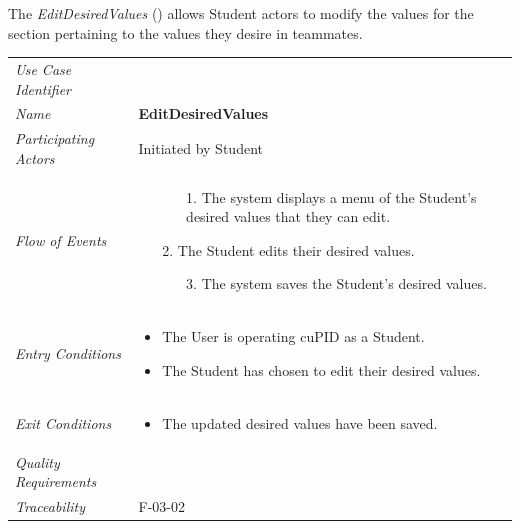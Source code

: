 \documentclass[12pt,letterpaper]{article}
\begin{document}
\vspace{1em}
The {\it EditDesiredValues} ({\bf \editdesiredvalues{}}) allows Student actors to modify the values for the section pertaining to the values they desire in teammates.

\begin{center}
	\begin{tabu} to 
		\toprule
		Use Case Identifier & \editdesiredvalues{} \\
		Name & {\bf EditDesiredValues} \\
		Participating Actors & Initiated by Student \\
		Flow of Events & 
		\begin{minipage}[t]{\linewidth}
		    \begin{enumerate}
		        \item[]
		        \begin{enumerate}
				    \item[1.] The system displays a menu of the Student's desired values that they can edit.
		        \end{enumerate}
	            \item[2.] The Student edits their desired values.
	            \begin{enumerate}
				    \item[3.] The system saves the Student's desired values.
		        \end{enumerate}
			\end{enumerate}		
		\end{minipage} \\

		Entry Conditions &
		\begin{minipage}[t]{\linewidth}
			\begin{itemize}
			    \item The User is operating cuPID as a Student.
			    \item The Student has chosen to edit their desired values.
	        \end{itemize}
		\end{minipage} \\

		Exit Conditions &
		\begin{minipage}[t]{\linewidth}
			\begin{itemize}
			    \item The updated desired values have been saved.
	        \end{itemize}
		\end{minipage} \\

		Quality Requirements & \\

		Traceability &  F-03-02\\
		\toprule
	\end{tabu}
\end{center}
\end{document}
